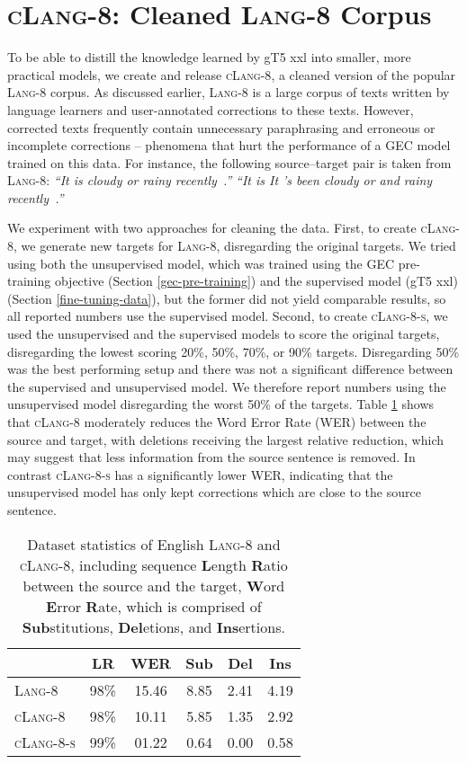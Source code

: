 \documentclass[11pt,a4paper]{article}
\newcommand{\GT}[0]{{gT5}\xspace}
\newcommand{\lang}[0]{{\scshape Lang-8}\xspace}
\newcommand{\clangg}[0]{{\scshape cLang-8}\xspace}
\newcommand{\clangs}[0]{{\scshape cLang-8-s}\xspace}
\begin{document}
\section{\clangg: Cleaned \lang Corpus} \label{lang8}
To be able to distill the knowledge learned by gT5 xxl into smaller, more practical models, we create and release \clangg, a cleaned version of the popular \lang corpus.
As discussed earlier, \lang is a large corpus of texts written by language learners and user-annotated corrections to these texts. 
However, corrected texts frequently contain unnecessary paraphrasing and erroneous or incomplete corrections -- phenomena that hurt the performance of a GEC model trained on this data.
For instance, the following source--target pair is taken from \lang: \textit{``It is cloudy or rainy recently~.''}  \textit{``It is It 's been cloudy or and rainy recently~.''}

We experiment with two approaches for cleaning the data. First, to create \clangg, we generate new targets for \lang, disregarding the original targets.
We tried using both the unsupervised model, which was trained using the GEC pre-training objective (Section \ref{gec-pre-training}) and the supervised model (\GT xxl) (Section \ref{fine-tuning-data}), but the former did not yield comparable results, so all reported numbers use the supervised model.
Second, to create \clangs, we used the unsupervised and the supervised models to score the original targets, disregarding the lowest scoring 20\%, 50\%, 70\%, or 90\% targets.
Disregarding 50\% was the best performing setup and there was not a significant difference between the supervised and unsupervised model.
We therefore report numbers using the unsupervised model disregarding the worst 50\% of the targets.
Table \ref{tbl:lang-8-stats} shows that \clangg moderately reduces the Word Error Rate (WER) between the source and target, with deletions receiving the largest relative reduction, which may suggest that less information from the source sentence is removed.
In contrast \clangs has a significantly lower WER, indicating that the unsupervised model has only kept corrections which are close to the source sentence.  

\begin{table}[t]
\footnotesize
\begin{tabularx}{\columnwidth}{Xccccc}
\toprule 
       & LR & WER & Sub  &  Del  &  Ins    \\ \midrule 
\lang &  98\%    &   15.46  &  8.85 & 2.41 & 4.19      \\
 \clangg      & 98\% &  10.11 &  5.85 & 1.35 & 2.92       \\ 
 \clangs & 99\% &01.22 & 0.64& 0.00 & 0.58 \\
 \bottomrule 
\end{tabularx}
\caption{Dataset statistics  of English \lang and \clangg, including sequence \textbf{L}ength \textbf{R}atio between the source and the target, \textbf{W}ord \textbf{E}rror \textbf{R}ate, which is comprised of \textbf{Sub}stitutions, \textbf{Del}etions, and \textbf{Ins}ertions.  }
\label{tbl:lang-8-stats}
\end{table}
\end{document}
